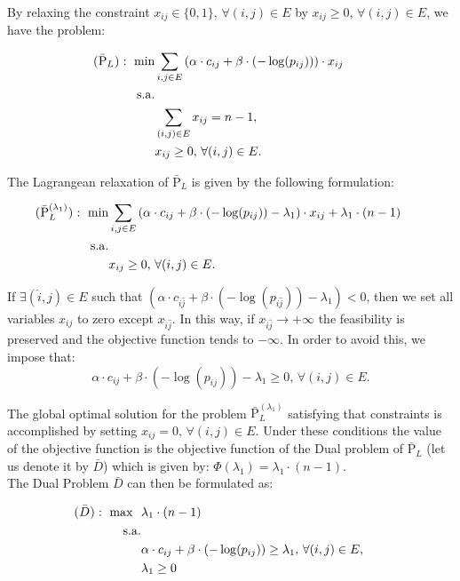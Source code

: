  By relaxing the constraint $x_{ij}\in \{0,1\},\,\forall (i,j)\in
E$ by $x_{ij}\geq 0,\, \forall (i,j)\in E$, we have the problem:

\begin{align}
 \textsc{($\bar{\mathrm{P}}_{L}$)}:~ \mathrm{min} &  \sum_{i,j\in E} \left(\alpha\cdot c_{ij}+\beta\cdot (-\log(p_{ij}))\right)\cdot x_{ij}   \nonumber\\
 \mathrm{s.a.} & \nonumber\\
 &                  \sum_{(i,j)\in E} x_{ij}=n-1, & \nonumber &\\
 &                 x_{ij}\geq 0,\, \forall (i,j)\in E.   & \nonumber  &
\end{align}

The Lagrangean relaxation of $\bar{\mathrm{P}}_{L}$ is given by
the following formulation:

\begin{align}
 \textsc{($\bar{\mathrm{P}}^{(\lambda_{1})}_{L}$)}:~ \mathrm{min} &  \sum_{i,j\in E} \left(\alpha\cdot c_{ij}+\beta\cdot (-\log(p_{ij}))-\lambda_{1}\right)\cdot x_{ij}+\lambda_{1}\cdot(n-1)   \nonumber\\
 \mathrm{s.a.} & \nonumber\\
 &                 x_{ij}\geq 0,\, \forall (i,j)\in E.   & \nonumber  &
\end{align}

If $\exists (\hat{i},\hat{j})\in E$ such that $(\alpha\cdot
c_{\hat{i}\hat{j}}+\beta\cdot
(-\log(p_{\hat{i}\hat{j}}))-\lambda_{1})<0$, then we set all
variables $x_{ij}$ to zero except $x_{\hat{i}\hat{j}}$. In this
way, if $x_{\hat{i}\hat{j}}\rightarrow +\infty$ the feasibility is
preserved and the objective function tends to $-\infty$. In order
to avoid this, we impose that:
\[\alpha\cdot c_{ij}+\beta\cdot (-\log(p_{ij}))-\lambda_{1}\geq 0,\, \forall (i,j)\in
 E. \]

The global optimal solution for the problem
$\bar{\mathrm{P}}^{(\lambda_{1})}_{L}$ satisfying that constraints
is accomplished by setting $x_{ij}=0,\,\forall (i,j)\in E$. Under
these conditions the value of the objective function is the
objective function of the Dual problem of $\bar{\mathrm{P}}_{L}$
(let us denote it by $\bar{D}$) which is given by:
$\Phi(\lambda_{1})=\lambda_{1}\cdot (n-1)$.\\

The Dual Problem $\bar{D}$ can then be formulated as:

\begin{align}
 \textsc{($\bar{D}$)}:~ \mathrm{max}~~ &  \lambda_{1}\cdot(n-1)   \nonumber\\
 \mathrm{s.a.} & \nonumber\\
  &                \alpha\cdot c_{ij}+\beta\cdot (-\log(p_{ij}))\geq \lambda_{1},\, \forall (i,j)\in E,   & \nonumber &\\
 &                 \lambda_{1}\geq 0   & \nonumber  &
\end{align}

